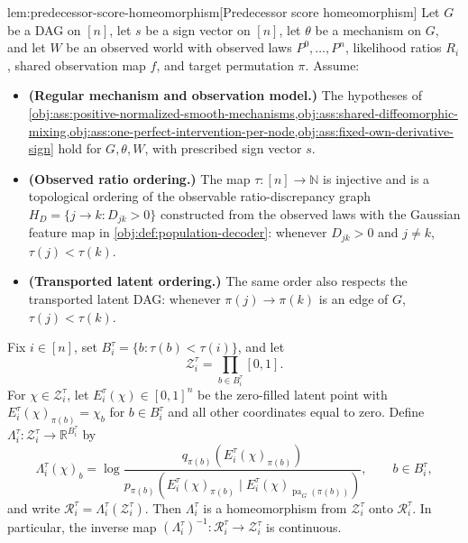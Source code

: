 \documentclass[11pt]{article}
\begin{document}
\begin{lemmav}{lem:predecessor-score-homeomorphism}[Predecessor score homeomorphism]
Let \(G\) be a DAG on \([n]\), let \(s\) be a sign vector on \([n]\), let \(\theta\) be a mechanism on \(G\), and let \(W\) be an observed world with observed laws \(P^0,\ldots,P^n\), likelihood ratios \(R_i\), shared observation map \(f\), and target permutation \(\pi\). Assume:
\begin{itemize}
\item \textbf{(Regular mechanism and observation model.)} The hypotheses of \cref{obj:ass:positive-normalized-smooth-mechanisms,obj:ass:shared-diffeomorphic-mixing,obj:ass:one-perfect-intervention-per-node,obj:ass:fixed-own-derivative-sign} hold for \(G,\theta,W\), with prescribed sign vector \(s\).
\item \textbf{(Observed ratio ordering.)} The map \(\tau:[n]\to\mathbb N\) is injective and is a topological ordering of the observable ratio-discrepancy graph \(H_D=\{j\to k:D_{jk}>0\}\) constructed from the observed laws with the Gaussian feature map in \cref{obj:def:population-decoder}: whenever \(D_{jk}>0\) and \(j\ne k\), \(\tau(j)<\tau(k)\).
\item \textbf{(Transported latent ordering.)} The same order also respects the transported latent DAG: whenever \(\pi(j)\to\pi(k)\) is an edge of \(G\), \(\tau(j)<\tau(k)\).
\end{itemize}
Fix \(i\in[n]\), set \(B_i^\tau=\{b:\tau(b)<\tau(i)\}\), and let
\[
\mathcal Z_i^\tau=\prod_{b\in B_i^\tau}[0,1].
\]
For \(\chi\in\mathcal Z_i^\tau\), let \(E_i^\tau(\chi)\in[0,1]^n\) be the zero-filled latent point with \(E_i^\tau(\chi)_{\pi(b)}=\chi_b\) for \(b\in B_i^\tau\) and all other coordinates equal to zero. Define \(\Lambda_i^\tau:\mathcal Z_i^\tau\to\mathbb R^{B_i^\tau}\) by
\[
\Lambda_i^\tau(\chi)_b
=
\log
\frac{
q_{\pi(b)}\!\left(E_i^\tau(\chi)_{\pi(b)}\right)
}{
p_{\pi(b)}\!\left(E_i^\tau(\chi)_{\pi(b)}\mid E_i^\tau(\chi)_{\operatorname{pa}_G(\pi(b))}\right)
},
\qquad b\in B_i^\tau,
\]
and write \(\mathcal R_i^\tau=\Lambda_i^\tau(\mathcal Z_i^\tau)\). Then \(\Lambda_i^\tau\) is a homeomorphism from \(\mathcal Z_i^\tau\) onto \(\mathcal R_i^\tau\). In particular, the inverse map \((\Lambda_i^\tau)^{-1}:\mathcal R_i^\tau\to\mathcal Z_i^\tau\) is continuous.
\end{lemmav}
\end{document}
